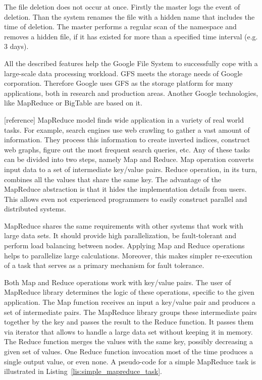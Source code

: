 The file deletion does not occur at once.
Firstly the master logs the event of deletion.
Than the system renames the file with a hidden name that includes the time of deletion.
The master performs a regular scan of the namespace and removes a hidden file, if it has existed for more than a specified time interval (e.g. 3 days). 

All the described features help the Google File System to successfully cope with a large-scale data processing workload.
GFS meets the storage needs of Google corporation.
Therefore Google uses GFS as the storage platform for many applications, both in research and production areas.
Another Google technologies, like MapReduce or BigTable are based on it.  	 

[reference]
MapReduce model finds wide application in a variety of real world tasks.
For example, search engines use web crawling to gather a vast amount of information.
They process this information to create inverted indices, construct web graphs, figure out the most frequent search queries, etc.
Any of these tasks can be divided into two steps, namely Map and Reduce.
Map operation converts input data to a set of intermediate key/value pairs.
Reduce operation, in its turn, combines all the values that share the same key.
The advantage of the MapReduce abstraction is that it hides the implementation details from users.
This allows even not experienced programmers to easily construct parallel and distributed systems.

MapReduce shares the same requirements with other systems that work with large data sets.
It should provide high parallelization, be fault-tolerant and perform load balancing between nodes.
Applying Map and Reduce operations helps to parallelize large calculations.
Moreover, this makes simpler re-execution of a task that serves as a primary mechanism for fault tolerance.

Both Map and Reduce operations work with key/value pairs.
The user of MapReduce library determines the logic of these operations, specific to the given application.
The Map function receives an input a key/value pair and produces a set of intermediate pairs.
The MapReduce library groups these intermediate pairs together by the key and passes the result to the Reduce function.
It passes them via iterator that allows to handle a large data set without keeping it in memory.
The Reduce function merges the values with the same key, possibly decreasing a given set of values.
One Reduce function invocation most of the time produces a single output value, or even none.
A pseudo-code for a simple MapReduce task is illustrated in Listing~\ref{lis:simple_mapreduce_task}.

